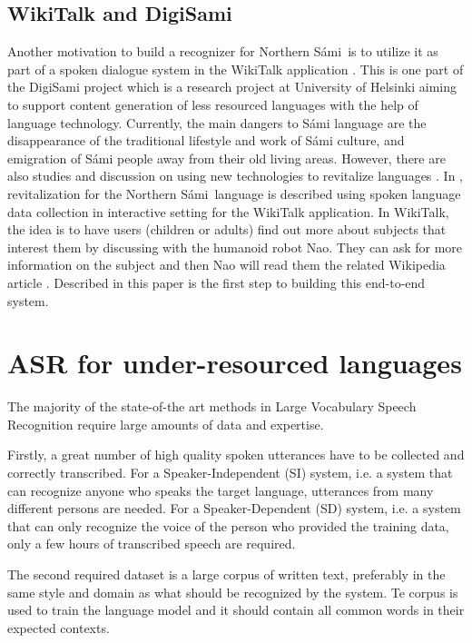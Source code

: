 \documentclass[b5paper]{article}
\newcommand{\ns}{Northern Sámi}
\begin{document}
\subsection{WikiTalk and DigiSami}
Another motivation to build a recognizer for \ns\ is to utilize it as part of  a spoken dialogue system in the WikiTalk application \cite{wilcock2013wikitalk}. This is one part of the DigiSami project which is a research project at University of Helsinki aiming to support content generation of less resourced languages with the help of language technology. Currently, the main dangers to Sámi language are the disappearance of the traditional lifestyle and work of Sámi culture, and emigration of Sámi people away from their old living areas. However, there are also studies and discussion on using new technologies to revitalize languages \cite{eisenlohr2004language}. In \cite{jokinen2014open}, revitalization for the \ns\ language is described using spoken language data collection in interactive setting for the WikiTalk application. In WikiTalk, the idea is to have users (children or adults) find out more about subjects that interest them by discussing with the humanoid robot Nao. They can ask for more information on the subject and then Nao will read them the related Wikipedia article \cite{jokinen2014multimodal}. Described in this paper is the first step to building this end-to-end system.


\section{ASR for under-resourced languages}
The majority of the state-of-the art methods in Large Vocabulary Speech Recognition require large amounts of data and expertise. 

Firstly, a great number of high quality spoken utterances have to be collected and correctly transcribed. For a Speaker-Independent (SI) system, i.e. a system that can recognize anyone who speaks the target language, utterances from many different persons are needed. For a Speaker-Dependent (SD) system, i.e. a system that can only recognize the voice of the person who provided the training data, only a few hours of transcribed speech are required.

The second required dataset is a large corpus of written text, preferably in the same style and domain as what should be recognized by the system. Te corpus is used to train the language model and it should contain all common words in their expected contexts.
\end{document}
